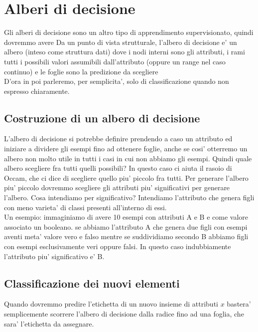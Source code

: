 \section{Alberi di decisione}
Gli alberi di decisione sono un altro tipo di apprendimento supervisionato, quindi dovremmo avere 
Da un punto di vista strutturale, l'albero di decisione e' un albero (inteso come struttura dati) dove i nodi interni sono gli attributi, i rami tutti i possibili valori assumibili dall'attributo (oppure un range nel caso continuo) e le foglie sono la predizione da scegliere\\D'ora in poi parleremo, per semplicita', solo di classificazione quando non espresso chiaramente.

\subsection{Costruzione di un albero di decisione}
L'albero di decisione si potrebbe definire prendendo a caso un attributo ed iniziare a dividere gli esempi fino ad ottenere foglie, anche se cosi' otterremo un albero  non molto utile in tutti i casi in cui non abbiamo gli esempi. Quindi quale albero scegliere fra tutti quelli possibili? In questo caso ci aiuta il rasoio di Occam, che ci dice di scegliere quello piu' piccolo fra tutti. Per generare l'albero piu' piccolo dovremmo scegliere gli attributi piu' significativi per generare l'albero. Cosa intendiamo per significativo? Intendiamo l'attributo che genera figli con meno varieta' di classi presenti all'interno di essi.\\ Un esempio: immaginiamo di avere 10 esempi con attributi A e B e come valore associato un booleano. se abbiamo l'attributo A che genera due figli con esempi aventi meta' valore vero e falso mentre se suddividiamo secondo B abbiamo figli con esempi esclusivamente veri oppure falsi. In questo caso indubbiamente l'attributo piu' significativo e' B.

\subsection{Classificazione dei nuovi elementi}
Quando dovremmo predire l'etichetta di un nuovo insieme di attributi $x$ bastera' semplicemente scorrere l'albero di decisione dalla radice fino ad una foglia, che sara' l'etichetta da assegnare.

